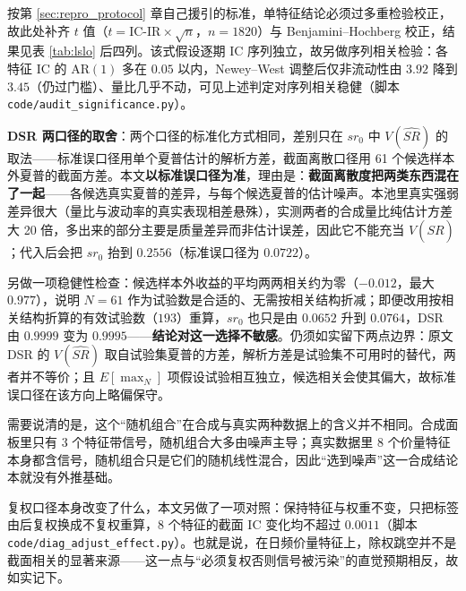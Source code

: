 按第 \ref{sec:repro_protocol} 章自己援引的标准，单特征结论必须过多重检验校正，故此处补齐 $t$ 值（$t=\text{IC-IR}\times\sqrt{n}$，$n=1820$）与 Benjamini--Hochberg 校正，结果见表 \ref{tab:lslo} 后四列。该式假设逐期 IC 序列独立，故另做序列相关检验：各特征 IC 的 $\text{AR}(1)$ 多在 $0.05$ 以内，Newey--West 调整后仅非流动性由 $3.92$ 降到 $3.45$（仍过门槛）、量比几乎不动，可见上述判定对序列相关稳健（脚本 \texttt{code/audit\_significance.py}）。

\textbf{DSR 两口径的取舍}：两个口径的标准化方式相同，差别只在 $sr_0$ 中 $V(\widehat{SR})$ 的取法——标准误口径用单个夏普估计的解析方差，截面离散口径用 61 个候选样本外夏普的截面方差。本文\textbf{以标准误口径为准}，理由是：\textbf{截面离散度把两类东西混在了一起}——各候选真实夏普的差异，与每个候选夏普的估计噪声。本池里真实强弱差异很大（量比与波动率的真实表现相差悬殊），实测两者的合成量比纯估计方差大 20 倍，多出来的部分主要是质量差异而非估计误差，因此它不能充当 $V(\widehat{SR})$；代入后会把 $sr_0$ 抬到 $0.2556$（标准误口径为 $0.0722$）。

另做一项稳健性检查：候选样本外收益的平均两两相关约为零（$-0.012$，最大 $0.977$），说明 $N=61$ 作为试验数是合适的、无需按相关结构折减；即便改用按相关结构折算的有效试验数（$193$）重算，$sr_0$ 也只是由 $0.0652$ 升到 $0.0764$，DSR 由 $0.9999$ 变为 $0.9995$——\textbf{结论对这一选择不敏感}。仍须如实留下两点边界：原文 DSR 的 $V(\widehat{SR})$ 取自试验集夏普的方差，解析方差是试验集不可用时的替代，两者并不等价；且 $E[\max_N]$ 项假设试验相互独立，候选相关会使其偏大，故标准误口径在该方向上略偏保守。

需要说清的是，这个“随机组合”在合成与真实两种数据上的含义并不相同。合成面板里只有 3 个特征带信号，随机组合大多由噪声主导；真实数据里 8 个价量特征本身都含信号，随机组合只是它们的随机线性混合，因此“选到噪声”这一合成结论本就没有外推基础。

复权口径本身改变了什么，本文另做了一项对照：保持特征与权重不变，只把标签由后复权换成不复权重算，8 个特征的截面 IC 变化均不超过 $0.0011$（脚本 \texttt{code/diag\_adjust\_effect.py}）。也就是说，在日频价量特征上，除权跳空并不是截面相关的显著来源——这一点与“必须复权否则信号被污染”的直觉预期相反，故如实记下。

